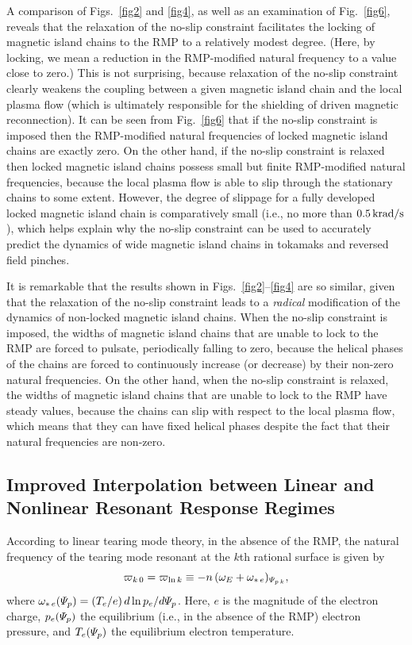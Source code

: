 \documentclass[12pt,prb,aps]{revtex4-1}
\begin{document}
A comparison of Figs.~\ref{fig2} and \ref{fig4}, as well as an examination of Fig.~\ref{fig6}, reveals that the relaxation of the
no-slip constraint facilitates the locking of magnetic island chains to the RMP to a relatively modest degree. (Here, by locking, we mean a reduction in the
RMP-modified natural frequency to a value close to zero.) 
This is not surprising, because 
relaxation of the no-slip constraint clearly weakens the coupling between a given magnetic island chain and the local plasma flow (which is ultimately responsible
for the shielding of driven magnetic reconnection). 
It can be seen from Fig.~\ref{fig6} that if the no-slip constraint is imposed then the RMP-modified natural frequencies of locked magnetic
island chains are exactly zero. On the other hand, if the no-slip constraint is relaxed then locked magnetic island chains possess
 small but finite RMP-modified natural frequencies, because the local plasma flow is able to slip through the  stationary chains to some
 extent. However, the degree of slippage for a fully developed locked magnetic island chain is comparatively small (i.e., no more than
 $0.5\,{\rm krad/s}$), which helps explain
 why the no-slip constraint can be used to accurately predict the dynamics of wide magnetic island chains in tokamaks and reversed field pinches.\cite{rfp} 

It is remarkable that the results shown in Figs.~\ref{fig2}--\ref{fig4} are so similar, given that the relaxation of the no-slip constraint leads to a
{\em radical}\/ modification of the dynamics of non-locked magnetic island chains. When the no-slip constraint is imposed, the widths of magnetic island chains that are
unable to lock to the RMP are forced to pulsate, periodically falling to zero, because the helical phases of the chains are forced to
continuously increase (or decrease) by their non-zero natural frequencies.\cite{rfb,rfc,rf1,pulse} On the other hand, when the no-slip
constraint is relaxed, the widths of magnetic island chains that are unable to lock to the RMP have steady values, because the  chains can
slip with respect to the local plasma flow, which means that they can have fixed helical phases despite the fact that their natural
frequencies are non-zero. 

\subsection{Improved Interpolation between Linear and Nonlinear Resonant Response Regimes}\label{s4b}
According to linear tearing mode theory, in the absence of the RMP, the natural frequency of the tearing mode resonant at the $k$th rational surface is given by\,\cite{ara,lin1,lin2,lin3}
\begin{equation}\label{elin}
\varpi_{k\,0} = \varpi_{{\rm ln}\,k} \equiv - n\,(\omega_E+\omega_{\ast\,e})_{{\mit\Psi}_{p\,k}},
\end{equation}
where
$\omega_{\ast\,e}({\mit\Psi}_p)=(T_e/e)\,d\ln p_e/d{\mit\Psi}_p$.
 Here,  $e$ is the magnitude of the electron charge,  $p_e({\mit\Psi}_p)$  the equilibrium (i.e., in the absence of the RMP)
electron pressure, and $T_e({\mit\Psi}_p)$ the equilibrium
electron temperature.
\end{document}
